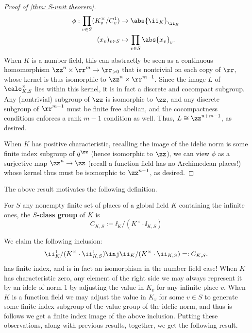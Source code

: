 \documentclass[11pt, x11names, openany]{book}
\begin{document}
\begin{proof}[Proof of \ref{thm: S-unit theorem}]
    \begin{align*}
        \phi: \prod_{v \in S} (K_v^\times /C_v^1) &\to \abs{\ii_K}_{\ii_K}\\
         (x_v)_{v \in S}  &\mapsto \prod_{v \in S} \abs{x_v}_v.
    \end{align*}
    When $K$ is a number field, this can abstractly be seen as a continuous homomorphism $\zz^n \times \rr^m \to \rr_{> 0}$ that is nontrivial on each copy of $\rr$, whose kernel is thus isomorphic to $\zz^n \times \rr^{m-1}$. Since the image $L$ of $\calo^\times_{K, S}$ lies within this kernel, it is in fact a discrete and cocompact subgroup. Any (nontrivial) subgroup of $\zz$ is isomorphic to $\zz$, and any discrete subgroup of $\rr^{m-1}$ must be finite free abelian, and the cocompactness conditions enforces a rank $m-1$ condition as well. Thus, $L \cong \zz^{n + m - 1}$, as desired.

    When $K$ has positive characteristic, recalling the image of the idelic norm is some finite index subgroup of $q^\zz$ (hence isomorphic to $\zz$), we can view $\phi$ as a surjective map $\zz^n \to \zz$ (recall a function field has no Archimedean places!) whose kernel thus must be isomorphic to $\zz^{n-1}$, as desired.
\end{proof}

The above result motivates the following definition.

\begin{defn}
\label{def: S-class group}
    For $S$ any nonempty finite set of places of a global field $K$ containing the infinite ones, the \textbf{$S$-class group} of $K$ is
    \begin{equation*}
        C_{K, S} := \ii_K/(K^\times \cdot \ii_{K, S})
    \end{equation*}
\end{defn}

\begin{observation}
    We claim the following inclusion:
    \begin{equation*}
        \ii^1_K/(K^\times \cdot \ii^1_{K, S}) \inj  \ii_K/(K^\times \cdot \ii_{K, S}) =: C_{K, S}.
    \end{equation*}
    has finite index, and is in fact an isomorphism in the number field case! When $K$ has characteristic zero, any element of the right side we may always represent it by an idele of norm 1 by adjusting the value in $K_v$ for any infinite place $v$. When $K$ is a function field we may adjust the value in $K_v$ for some $v \in S$ to generate some finite index subgroup of the value group of the idelic norm, and thus is follows we get a finite index image of the above inclusion. Putting these observations, along with previous results, together, we get the following result.
\end{observation}
\end{document}

